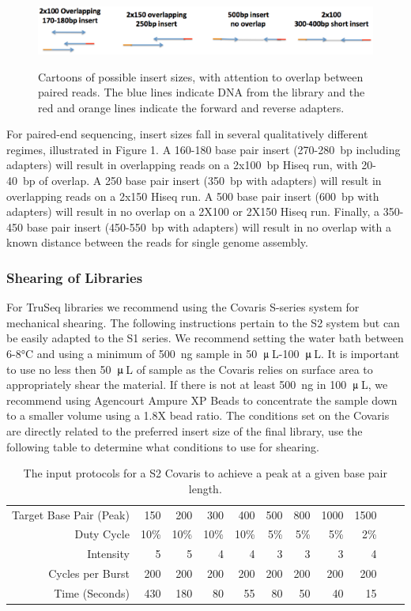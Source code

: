\documentclass[graybox]{svmult}
\begin{document}
\begin{figure}[t]
\caption{Cartoons of possible insert sizes, with attention to overlap between paired reads.  The blue lines indicate DNA from the library and the red and orange lines indicate the forward and reverse adapters.}
\includegraphics[width=11.5cm]{imgs/image1.eps}
%
\label{fig:1}       %
\end{figure}

For paired-end sequencing, insert sizes fall in several qualitatively different regimes, illustrated in Figure 1.    A 160-180 base pair insert (270-280~bp including adapters) will result in overlapping reads on a 2x100~bp Hiseq run, with 20-40~bp of overlap.  A 250 base pair insert  (350~bp with adapters) will result in overlapping reads on a 2x150 Hiseq run. A 500 base pair insert (600~bp with adapters) will result in no overlap on a 2X100 or 2X150 Hiseq run. Finally, a 350-450 base pair insert (450-550~bp with adapters) will result in no overlap with a known distance between the reads for single genome assembly.

\subsubsection{Shearing of Libraries}

For TruSeq libraries we recommend using the Covaris S-series system for mechanical shearing. The following instructions pertain to the S2 system but can be easily adapted to the S1 series.  We recommend setting the water bath between 6-8°C and using a minimum of 500~ng sample in 50~$\umu$\,L-100~$\umu$\,L. It is important to use no less then 50~$\umu$\,L of sample as the Covaris relies on surface area to appropriately shear the material.  If there is not at least 500~ng in 100~$\umu$\,L, we recommend using Agencourt Ampure XP Beads to concentrate the sample down to a smaller volume using a 1.8X bead ratio.  The conditions set on the Covaris are directly related to the preferred insert size of the final library, use the following table to determine what conditions to use for shearing.

\begin{table}
\label{shearingtable}
\caption{The input protocols for a S2 Covaris to achieve a peak at a given base pair length.}
\begin{tabular}{rrrrrrrrrrr}
Target Base Pair (Peak) & 150 & 200 & 300 & 400 & 500 & 800 & 1000 & 1500  \\
Duty Cycle & 10\% & 10\% & 10\% & 10\% & 5\% & 5\% & 5\% & 2\%  \\
Intensity & 5 & 5 & 4 & 4 & 3 & 3 & 3 & 4  \\
Cycles per Burst & 200 & 200 & 200 & 200 & 200 & 200 & 200 & 200  \\
Time (Seconds) & 430 & 180 & 80 & 55 & 80 & 50 & 40 & 15  \\
\end{tabular}
\end{table}
\end{document}
